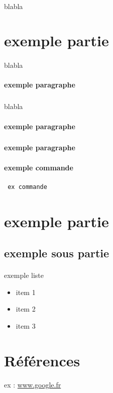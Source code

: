 \documentclass[a4paper,12pt]{article}
\begin{document}
\paragraph{}
blabla

\section{exemple partie}
\paragraph{}
blabla

\paragraph{exemple paragraphe}
\subparagraph{}
blabla

\paragraph{exemple paragraphe}
\subparagraph{}

\paragraph{exemple paragraphe}
\paragraph{}

\paragraph{exemple commande}
\begin{verbatim}
 ex commande
\end{verbatim}

\clearpage
\section{exemple partie}
\subsection{exemple sous partie}
\paragraph{}

exemple liste
\begin{itemize}
\item item 1
\item item 2 
\item item 3
\end{itemize}


\clearpage
\section{Références}

ex :
\url{www.google.fr}\
\end{document}
